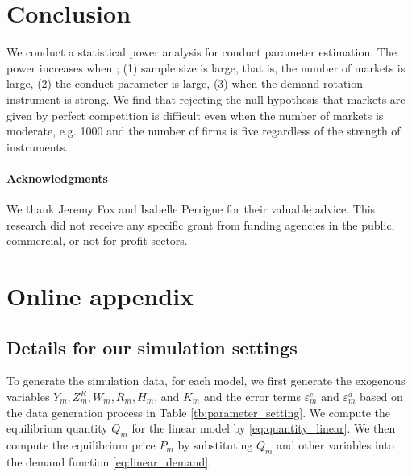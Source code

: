 \documentclass[11pt, a4paper]{article}
\begin{document}
\section{Conclusion}

We conduct a statistical power analysis for conduct parameter estimation. The power increases when ; (1) sample size is large, that is, the number of markets is large, (2) the conduct parameter is large, (3) when the demand rotation instrument is strong. We find that rejecting the null hypothesis that markets are given by perfect competition is difficult even when the number of markets is moderate, e.g. 1000 and the number of firms is five regardless of the strength of instruments.


\paragraph{Acknowledgments}
We thank Jeremy Fox and Isabelle Perrigne for their valuable advice. This research did not receive any specific grant from funding agencies in the public, commercial, or not-for-profit sectors. 

\newpage





\newpage

\setcounter{page}{1}
\appendix
\section{Online appendix}\label{sec:appendix}




\subsection{Details for our simulation settings}

To generate the simulation data, for each model, we first generate the exogenous variables $Y_m, Z^{R}_{m}, W_m, R_{m}, H_m$, and $K_m$ and the error terms $\varepsilon_{m}^c$ and $\varepsilon_{m}^d$ based on the data generation process in Table \ref{tb:parameter_setting}.
We compute the equilibrium quantity $Q_{m}$ for the linear model by \eqref{eq:quantity_linear}.
We then compute the equilibrium price $P_m$ by substituting $Q_{m}$ and other variables into the demand function \eqref{eq:linear_demand}.
\end{document}
